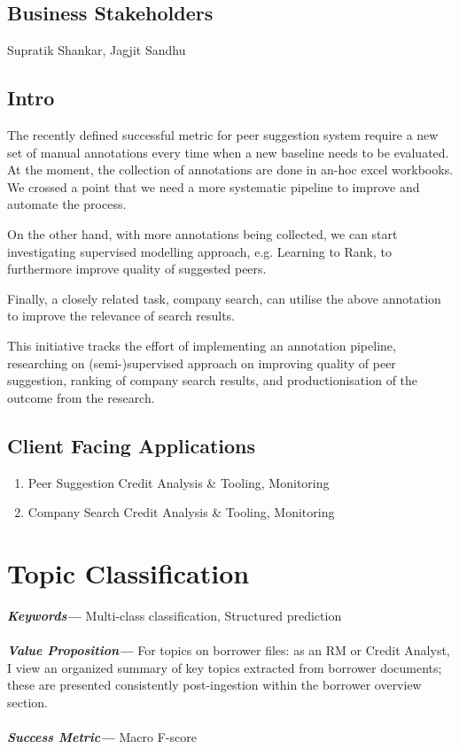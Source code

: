 \documentclass[]{article}
\providecommand{\keywords}[1]{\textbf{\textit{Keywords---}} #1}
\providecommand{\values}[1]{\textbf{\textit{Value Proposition---}} #1}
\providecommand{\successmetric}[1]{\textbf{\textit{Success Metric---}} #1}
\begin{document}
\subsection{Business Stakeholders}
Supratik Shankar, Jagjit Sandhu

\subsection{Intro}

The recently defined successful metric for peer suggestion system require a new 
set of manual annotations every time when a new baseline needs to be evaluated. 
At the moment, the collection of annotations are done in an-hoc excel 
workbooks. We crossed a point that we need a more systematic pipeline to 
improve and automate the process. 

On the other hand, with more annotations being collected, we can start 
investigating supervised modelling approach, e.g. Learning to Rank, to 
furthermore improve quality of suggested peers.

Finally, a closely related task, company search, can utilise the above 
annotation to improve the relevance of search results. 

This initiative tracks the effort of implementing an 
annotation pipeline, researching on (semi-)supervised approach on improving 
quality of peer suggestion, ranking of company search results, and 
productionisation of the outcome from the research.


\subsection{Client Facing Applications}
\begin{enumerate}
    \item Peer Suggestion \textrightarrow Credit Analysis \& Tooling, Monitoring
    \item Company Search \textrightarrow Credit Analysis \& Tooling, Monitoring
\end{enumerate}

\newpage

\section{Topic Classification}
\keywords{Multi-class classification, Structured prediction}
\\\\
\noindent
\values{For topics on borrower files: as an RM or Credit Analyst, I view an 
organized summary of key topics 
extracted from borrower documents; these are presented consistently 
post-ingestion within the borrower overview section.}
\\\\
\noindent
\successmetric{Macro F-score}
\end{document}
